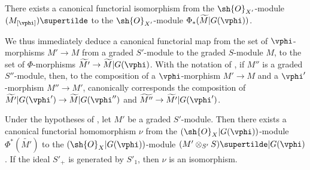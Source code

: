 \begin{proposition}[2.8.7]
\label{II.2.8.7}
There exists a canonical functorial isomorphism from the $\sh{O}_{X'}$-module $(M_{[\vphi]})\supertilde$ to the $\sh{O}_{X'}$-module $\Phi_*(\widetilde{M}|G(\vphi))$.
\end{proposition}

We thus immediately deduce a canonical functorial map from the set of $\vphi$-morphisms $M'\to M$ from a graded $S'$-module to the graded $S$-module $M$, to the set of $\Phi$-morphisms $\widetilde{M'}\to\widetilde{M}|G(\vphi)$.
With the notation of , if $M''$ is a graded $S''$-module, then, to the composition of a $\vphi$-morphism $M'\to M$ and a $\vphi'$-morphism $M''\to M'$, canonically corresponds the composition of $\widetilde{M'}|G(\vphi')\to\widetilde{M}|G(\vphi'')$ and $\widetilde{M''}\to\widetilde{M'}|G(\vphi')$.

\begin{proposition}[2.8.8]
\label{II.2.8.8}
Under the hypotheses of , let $M'$ be a graded $S'$-module.
Then there exists a canonical functorial homomorphism $\nu$ from the $(\sh{O}_X|G(\vphi))$-module $\Phi^*(\widetilde{M'})$ to the $(\sh{O}_X|G(\vphi))$-module $(M'\otimes_{S'}S)\supertilde|G(\vphi)$.
If the ideal $S'_+$ is generated by $S'_1$, then $\nu$ is an isomorphism.
\end{proposition}

